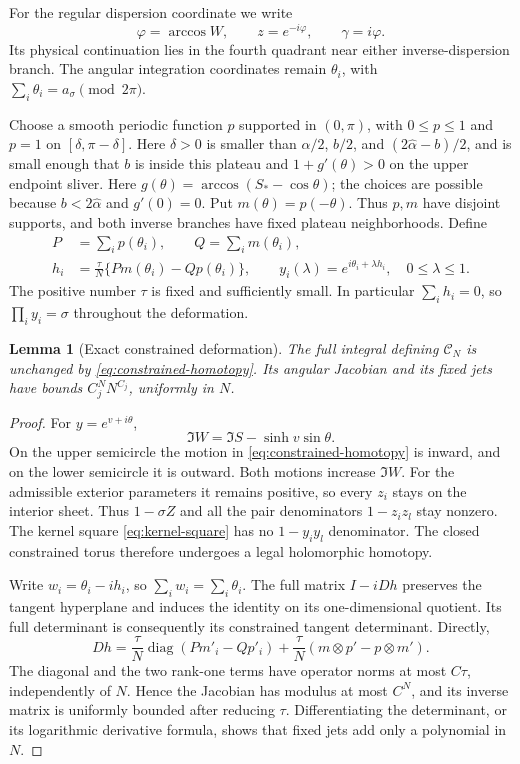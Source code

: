 \documentclass[11pt]{article}
\numberwithin{equation}{section}
\newtheorem{lemma}[theorem]{Lemma}
\theoremstyle{remark}\newtheorem{remark}[theorem]{Remark}
\begin{document}
For the regular dispersion coordinate we write
\[
 \varphi=\arccos W,\qquad z=e^{-i\varphi},\qquad
 \gamma=i\varphi.
\]
Its physical continuation lies in the fourth quadrant near either
inverse-dispersion branch.  The angular integration coordinates remain
$\theta_i$, with $\sum_i\theta_i=a_\sigma\pmod {2\pi}$.

Choose a smooth periodic function $p$ supported in $(0,\pi)$,
with $0\le p\le1$ and $p=1$ on $[\delta,\pi-\delta]$.
Here $\delta>0$ is smaller than $\widehat\alpha/2$, $b/2$, and
$(2\widehat\alpha-b)/2$, and is small enough that $b$ is inside this
plateau and $1+g'(\theta)>0$ on the upper endpoint sliver.
Here $g(\theta)=\arccos(S_*-\cos\theta)$; the choices are
possible because $b<2\widehat\alpha$ and $g'(0)=0$.  Put $m(\theta)=p(-\theta)$.  Thus $p,m$ have
disjoint supports, and both inverse branches have fixed plateau
neighborhoods.  Define
\begin{equation}\label{eq:constrained-homotopy}
 \begin{aligned}
 P&=\sum_i p(\theta_i),\qquad Q=\sum_i m(\theta_i),\\
 h_i&=\frac\tau N\{P m(\theta_i)-Q p(\theta_i)\},\qquad
 y_i(\lambda)=e^{i\theta_i+\lambda h_i},\quad 0\le\lambda\le1.
 \end{aligned}
\end{equation}
The positive number $\tau$ is fixed and sufficiently small.  In
particular $\sum_i h_i=0$, so $\prod_i y_i=\sigma$ throughout the
deformation.

\begin{lemma}[Exact constrained deformation]
\label{lem:constrained-homotopy}
The full integral defining $\mathcal C_N$ is unchanged by
\eqref{eq:constrained-homotopy}.  Its angular Jacobian and its fixed
jets have bounds $C_j^N N^{C_j}$, uniformly in $N$.
\end{lemma}
\begin{proof}
For $y=e^{v+i\theta}$,
\[
 \Im W=\Im S-\sinh v\sin\theta.
\]
On the upper semicircle the motion in
\eqref{eq:constrained-homotopy} is inward, and on the lower
semicircle it is outward.  Both motions increase $\Im W$.
For the admissible exterior parameters it remains positive, so every
$z_i$ stays on the interior sheet.  Thus $1-\sigma Z$ and all the pair
denominators $1-z_i z_l$ stay nonzero.  The kernel square \eqref{eq:kernel-square} has no
$1-y_i y_l$ denominator.  The closed constrained torus therefore
undergoes a legal holomorphic homotopy.

Write $w_i=\theta_i-i h_i$, so $\sum_iw_i=\sum_i\theta_i$.
The full matrix $I-iDh$ preserves the tangent hyperplane and induces
the identity on its one-dimensional quotient.  Its full determinant
is consequently its constrained tangent determinant.  Directly,
\[
 Dh=\frac\tau N\operatorname{diag}(P m'_i-Qp'_i)
       +\frac\tau N(m\otimes p'-p\otimes m').
\]
The diagonal and the two rank-one terms have operator norms at most
$C\tau$, independently of $N$.  Hence the Jacobian has modulus at
most $C^N$, and its inverse matrix is uniformly bounded after reducing
$\tau$.  Differentiating the determinant, or its logarithmic derivative
formula, shows that fixed jets add only a polynomial in $N$.
\end{proof}
\end{document}
